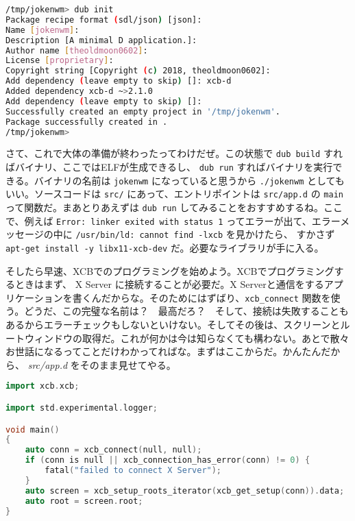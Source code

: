 \documentclass[12pt,a4paper]{jsarticle}
\begin{document}
\begin{lstlisting}[language=bash]
/tmp/jokenwm> dub init                                                 14:23:14
Package recipe format (sdl/json) [json]: 
Name [jokenwm]: 
Description [A minimal D application.]: 
Author name [theoldmoon0602]: 
License [proprietary]: 
Copyright string [Copyright (c) 2018, theoldmoon0602]: 
Add dependency (leave empty to skip) []: xcb-d
Added dependency xcb-d ~>2.1.0
Add dependency (leave empty to skip) []: 
Successfully created an empty project in '/tmp/jokenwm'.
Package successfully created in .
/tmp/jokenwm>                                                          14:23:28
\end{lstlisting}

さて、これで大体の準備が終わったってわけだぜ。この状態で \lstinline{dub build} すればバイナリ、ここではELFが生成できるし、 \lstinline{dub run} すればバイナリを実行できる。バイナリの名前は \lstinline{jokenwm} になっていると思うから \lstinline{./jokenwm} としてもいい。ソースコードは \lstinline{src/} にあって、エントリポイントは \lstinline{src/app.d} の \lstinline{main} って関数だ。まあとりあえずは \lstinline{dub run} してみることをおすすめするね。ここで、例えば \lstinline{Error: linker exited with status 1} ってエラーが出て、エラーメッセージの中に \lstinline{/usr/bin/ld: cannot find -lxcb} を見かけたら、 すかさず \lstinline{apt-get install -y libx11-xcb-dev} だ。必要なライブラリが手に入る。

そしたら早速、XCBでのプログラミングを始めよう。XCBでプログラミングするときはまず、 X Server に接続することが必要だ。X Serverと通信をするアプリケーションを書くんだからな。そのためにはずばり、\lstinline{xcb_connect} 関数を使う。どうだ、この完璧な名前は？　最高だろ？　そして、接続は失敗することもあるからエラーチェックもしないといけない。そしてその後は、スクリーンとルートウィンドウの取得だ。これが何かは今は知らなくても構わない。あとで散々お世話になるってことだけわかってればな。まずはここからだ。かんたんだから、 \textit{src/app.d} をそのまま見せてやる。

\begin{lstlisting}[language=C++] 
import xcb.xcb;

import std.experimental.logger;

void main()
{
	auto conn = xcb_connect(null, null);
	if (conn is null || xcb_connection_has_error(conn) != 0) {
		fatal("failed to connect X Server");
	}
	auto screen = xcb_setup_roots_iterator(xcb_get_setup(conn)).data;
	auto root = screen.root;
}
\end{lstlisting}
\end{document}

